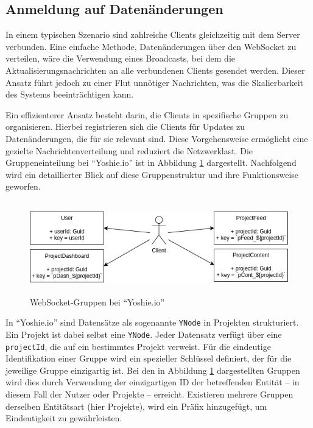 \documentclass[12pt]{book}          %
\begin{document}
\subsection{Anmeldung auf Datenänderungen}
\label{subsec-anmeldung-auf-datenaenderungen}

In einem typischen Szenario sind zahlreiche Clients gleichzeitig mit dem Server verbunden. Eine einfache Methode, Datenänderungen über den WebSocket zu verteilen, wäre die Verwendung eines Broadcasts, bei dem die Aktualisierungsnachrichten an alle verbundenen Clients gesendet werden. Dieser Ansatz führt jedoch zu einer Flut unnötiger Nachrichten, was die Skalierbarkeit des Systems beeinträchtigen kann.

Ein effizienterer Ansatz besteht darin, die Clients in spezifische Gruppen zu organisieren. Hierbei registrieren sich die Clients für Updates zu Datenänderungen, die für sie relevant sind. Diese Vorgehensweise ermöglicht eine gezielte Nachrichtenverteilung und reduziert die Netzwerklast. Die Gruppeneinteilung bei "`Yoshie.io"' ist in Abbildung \ref{abb-ws-groups} dargestellt. Nachfolgend wird ein detaillierter Blick auf diese Gruppenstruktur und ihre Funktionsweise geworfen.

\begin{figure}[htbp]
\centering
\includegraphics[height=4cm]{abbildungen/ws-groups.png}
\caption{WebSocket-Gruppen bei "`Yoshie.io"'}
\label{abb-ws-groups}
\end{figure}


In "`Yoshie.io"' sind Datensätze als sogenannte \texttt{YNode} in Projekten strukturiert. Ein Projekt ist dabei selbst eine \texttt{YNode}. Jeder Datensatz verfügt über eine \texttt{projectId}, die auf ein bestimmtes Projekt verweist. Für die eindeutige Identifikation einer Gruppe wird ein spezieller Schlüssel definiert, der für die jeweilige Gruppe einzigartig ist. Bei den in Abbildung \ref{abb-ws-groups} dargestellten Gruppen wird dies durch Verwendung der einzigartigen ID der betreffenden Entität – in diesem Fall der Nutzer oder Projekte – erreicht. Existieren mehrere Gruppen derselben Entitätsart (hier Projekte), wird ein Präfix hinzugefügt, um Eindeutigkeit zu gewährleisten.
\end{document}
